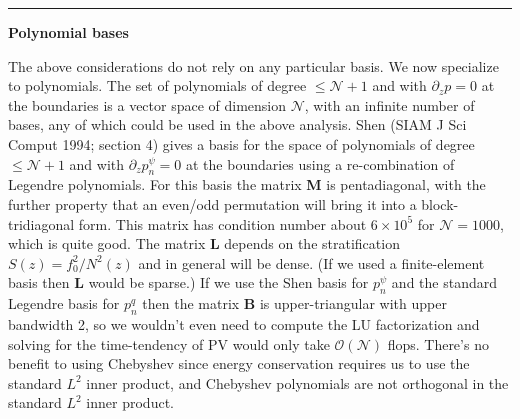 \documentclass[10pt]{article}
\newcommand{\pd}[1]{\partial_{#1}}
\newcommand{\sN}{\mathcal{N}}
\begin{document}
\hrule
\begin{center}{\bf Polynomial bases}\end{center}

The above considerations do not rely on any particular basis.
We now specialize to polynomials.
The set of polynomials of degree $\le \sN+1$ and with $\pd{z}p=0$ at the boundaries is a vector space of dimension $\sN$, with an infinite number of bases, any of which could be used in the above analysis.
Shen (SIAM J Sci Comput 1994; section 4) gives a basis for the space of polynomials of degree $\le \sN+1$ and with $\pd{z}p_n^\psi=0$ at the boundaries using a re-combination of Legendre polynomials.
For this basis the matrix {\bf M} is pentadiagonal, with the further property that an even/odd permutation will bring it into a block-tridiagonal form.
This matrix has condition number about $6\times10^5$ for $\sN=1000$, which is quite good.
The matrix {\bf L} depends on the stratification $S(z)=f_0^2/N^2(z)$ and in general will be dense.
(If we used a finite-element basis then {\bf L} would be sparse.)
If we use the Shen basis for $p_n^\psi$ and the standard Legendre basis for $p_n^q$ then the matrix {\bf B} is upper-triangular with upper bandwidth 2, so we wouldn't even need to compute the LU factorization and solving for the time-tendency of PV would only take $\mathcal{O}(\sN)$ flops.
There's no benefit to using Chebyshev since energy conservation requires us to use the standard $L^2$ inner product, and Chebyshev polynomials are not orthogonal in the standard $L^2$ inner product.
\end{document}
